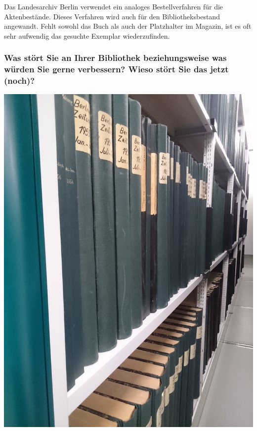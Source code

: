 Das Landesarchiv Berlin verwendet ein analoges Bestellverfahren für die
Aktenbestände. Dieses Verfahren wird auch für den Bibliotheksbestand
angewandt. Fehlt sowohl das Buch als auch der Platzhalter im Magazin,
ist es oft sehr aufwendig das gesuchte Exemplar wiederzufinden.

\hypertarget{was-stuxf6rt-sie-an-ihrer-bibliothek-beziehungsweise-was-wuxfcrden-sie-gerne-verbessern-wieso-stuxf6rt-sie-das-jetzt-noch}{%
\subsubsection*{Was stört Sie an Ihrer Bibliothek beziehungsweise was würden
Sie gerne verbessern? Wieso stört Sie das jetzt
(noch)?}\label{was-stuxf6rt-sie-an-ihrer-bibliothek-beziehungsweise-was-wuxfcrden-sie-gerne-verbessern-wieso-stuxf6rt-sie-das-jetzt-noch}}

\begin{center}
\includegraphics{landesarchiv/img/Zeitungen-Sign.jpg}
\end{center}

